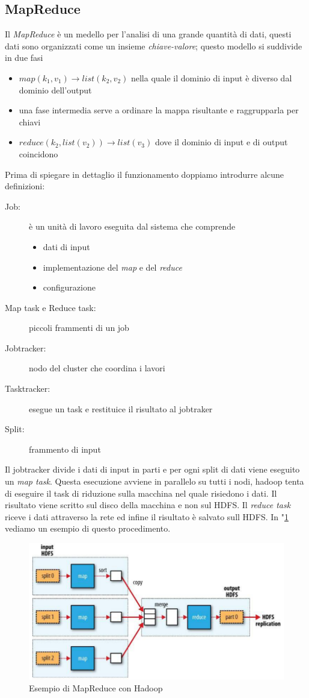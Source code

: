 \subsection{MapReduce}
Il \emph{MapReduce} è un medello per l'analisi di una grande quantità di dati, questi dati sono organizzati come un insieme \emph{chiave-valore}; questo modello si suddivide in due fasi
\begin{itemize}
	\item $map(k_1,v_1) \rightarrow list(k_2,v_2)$  nella quale il dominio di input è diverso dal dominio dell'output
	\item una fase intermedia serve a ordinare la mappa risultante e raggrupparla per chiavi
	\item $reduce(k_2,list(v_2))\rightarrow list(v_3)$ dove il dominio di input e di output coincidono
\end{itemize}
Prima di spiegare in dettaglio il funzionamento doppiamo introdurre alcune definizioni:
\begin{description}
	\item[Job:] è un unità di lavoro eseguita dal sistema che comprende
	\begin{itemize}
		\item dati di input
		\item implementazione del \emph{map} e del \emph{reduce}
		\item configurazione
	\end{itemize}
	\item[Map task e Reduce task:] piccoli frammenti di un job
	\item[Jobtracker:] nodo del cluster che coordina i lavori
	\item[Tasktracker:] esegue un task e restituice il risultato al jobtraker
	\item[Split:] frammento di input
\end{description}
Il jobtracker divide i dati di input in parti e per ogni split di dati viene eseguito un \emph{map task}. Questa esecuzione avviene in parallelo su tutti i nodi, hadoop tenta di eseguire il task di riduzione sulla macchina nel quale risiedono i dati. Il risultato viene scritto sul disco della macchina e non sul HDFS. Il \emph{reduce task} riceve i dati attraverso la rete ed infine il risultato è salvato sull HDFS. In \figurename"\ref{fig:mapreduce} vediamo un esempio di questo procedimento.
\begin{figure}
\centering
\includegraphics[width=0.7\linewidth]{img/mapreduce}
\caption{Esempio di MapReduce con Hadoop}
\label{fig:mapreduce}
\end{figure}
